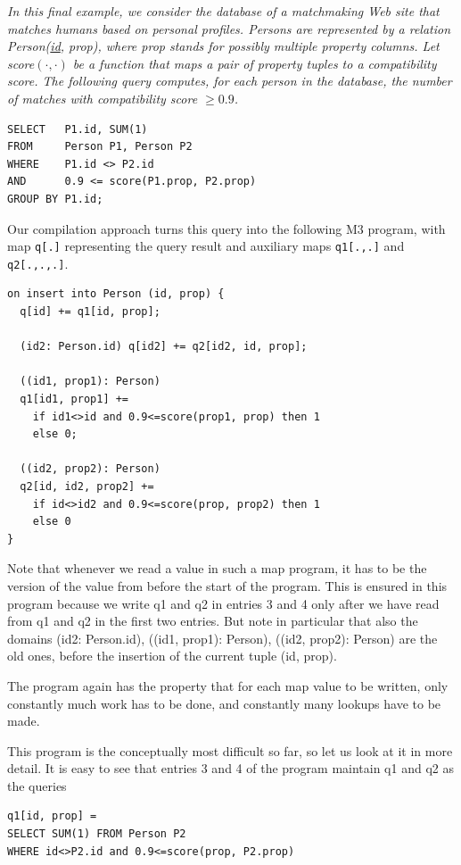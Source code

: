 \begin{example}\em
\label{ex:matchmaking}
In this final example, we consider the data\-base of a matchmaking Web site
that matches humans based on personal profiles. Persons are
represented by a relation Person(\underline{id}, prop), where
prop stands for possibly multiple property col\-umns. Let score$(\cdot, \cdot)$
be a function that maps a pair of property tuples to a compatibility score.
The following query computes, for each person in the database, the number of
matches with compatibility score $\ge 0.9$.
\begin{verbatim}
SELECT   P1.id, SUM(1)
FROM     Person P1, Person P2
WHERE    P1.id <> P2.id
AND      0.9 <= score(P1.prop, P2.prop)
GROUP BY P1.id;
\end{verbatim}

Our compilation approach turns this query into the following M3 program,
with map {\tt q[.]} representing the query result and auxiliary
maps {\tt q1[.,.]} and {\tt q2[.,.,.]}.
\begin{verbatim}
on insert into Person (id, prop) {
  q[id] += q1[id, prop];

  (id2: Person.id) q[id2] += q2[id2, id, prop];

  ((id1, prop1): Person)
  q1[id1, prop1] +=
    if id1<>id and 0.9<=score(prop1, prop) then 1
    else 0;

  ((id2, prop2): Person)
  q2[id, id2, prop2] +=
    if id<>id2 and 0.9<=score(prop, prop2) then 1
    else 0
}
\end{verbatim}
Note that whenever we read a value in such a map program, it has to be
the version of the value from before the start of the program. This is 
ensured in this program because we write q1 and q2 in entries 3 and 4 only
after we have read from q1 and q2 in the first two entries.
But note in particular that also the domains
(id2: Person.id), ((id1, prop1): Person), ((id2, prop2): Person)
are the old ones, before the insertion of the current tuple (id, prop).

The program again has the property that for
each map value to be written, only constantly much work has to be done,
and constantly many lookups have to be made.

This program is the conceptually most difficult so far, so let us look at it
in more detail. It is easy to see that entries 3 and 4 of the program
maintain q1 and q2 as the queries
\begin{verbatim}
q1[id, prop] =
SELECT SUM(1) FROM Person P2
WHERE id<>P2.id and 0.9<=score(prop, P2.prop) 


\end{verbatim}
\end{example}
